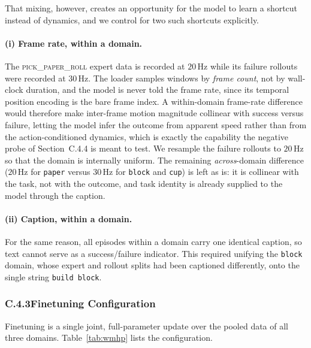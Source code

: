 \documentclass[letterpaper]{article} %
\begin{document}
That mixing, however, creates an opportunity for the model to learn a shortcut
instead of dynamics, and we control for two such shortcuts explicitly.

\paragraph{(i) Frame rate, within a domain.}
The \textsc{pick\_paper\_roll} expert data is recorded at $20$\,Hz while its
failure rollouts were recorded at $30$\,Hz. The loader samples windows by
\emph{frame count}, not by wall-clock duration, and the model is never told the
frame rate, since its temporal position encoding is the bare frame index. A
within-domain frame-rate difference would therefore make inter-frame motion
magnitude collinear with success versus failure, letting the model infer the
outcome from apparent speed rather than from the action-conditioned dynamics,
which is exactly the capability the negative probe of Section~C.4.4 is meant to
test. We resample the failure rollouts to $20$\,Hz so that the domain is
internally uniform. The remaining \emph{across}-domain difference
($20$\,Hz for \texttt{paper} versus $30$\,Hz for \texttt{block} and
\texttt{cup}) is left as is: it is collinear with the task, not with the
outcome, and task identity is already supplied to the model through the caption.

\paragraph{(ii) Caption, within a domain.}
For the same reason, all episodes within a domain carry one identical caption, so
text cannot serve as a success/failure indicator. This required unifying the
\texttt{block} domain, whose expert and rollout splits had been captioned
differently, onto the single string \texttt{build block}.

\subsubsection{C.4.3\quad Finetuning Configuration}

Finetuning is a single joint, full-parameter update over the pooled data of all
three domains. Table~\ref{tab:wmhp} lists the configuration.
\end{document}
